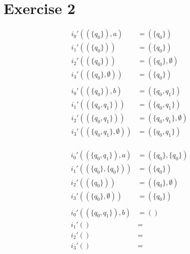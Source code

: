 \documentclass[a4paper,11pt]{report}
\begin{document}
\begin{center}
\end{center}

\section*{Exercise 2}

\begin{align*}
  i_0'((\{q_0\}),a) &= (\{q_0\}) \\
  i_1'((\{q_0\})) &= (\{q_0\}) \\
  i_2'((\{q_0\})) &=  (\{q_0\},\emptyset)\\
  i_3'((\{q_0\},\emptyset)) &= (\{q_0\}) \\ \\
  i_0'((\{q_0\}),b) &= (\{q_0,q_1\}) \\
  i_1'((\{q_0,q_1\})) &= (\{q_0,q_1\}) \\
  i_2'((\{q_0,q_1\})) &= (\{q_0,q_1\},\emptyset) \\
  i_3'((\{q_0,q_1\},\emptyset)) &= (\{q_0,q_1\}) \\
\end{align*}

\begin{align*}
  i_0'((\{q_0,q_1\}),a) &=  (\{q_0\},\{q_0\})\\
  i_1'((\{q_0\},\{q_0\})) &= (\{q_0\}) \\
  i_2'((\{q_0\})) &=  (\{q_0\},\emptyset)\\
  i_3'((\{q_0\},\emptyset)) &= (\{q_0\}) \\ \\
  i_0'((\{q_0,q_1\}),b) &= () \\
  i_1'() &=  \\
  i_2'() &=  \\
  i_3'() &=  \\
\end{align*}
\end{document}
